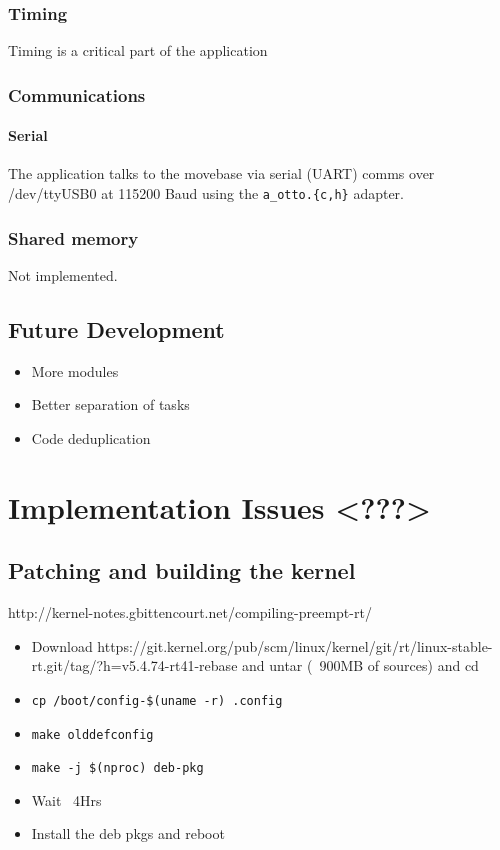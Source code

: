 \documentclass[a4paper,12pt]{report}
\begin{document}
\subsection{Timing}

Timing is a critical part of the application

\subsection{Communications}
\subsubsection{Serial}

The application talks to the movebase via serial (UART) comms over /dev/ttyUSB0 at 115200 Baud using the \texttt{a\_otto.\{c,h\}} adapter.

\subsection{Shared memory}

Not implemented.

\section{Future Development}

\begin{itemize}
    \item More modules
    \item Better separation of tasks
    \item Code deduplication
\end{itemize}

\newpage
\chapter{Implementation Issues <???>}
\section{Patching and building the kernel}

http://kernel-notes.gbittencourt.net/compiling-preempt-rt/

\begin{itemize}
    \item Download https://git.kernel.org/pub/scm/linux/kernel/git/rt/linux-stable-rt.git/tag/?h=v5.4.74-rt41-rebase and untar (~900MB of sources) and cd
    \item \texttt{cp /boot/config-\$(uname -r) .config}
    \item \texttt{make olddefconfig}
    \item \texttt{make -j \$(nproc) deb-pkg}
    \item Wait ~4Hrs
    \item Install the deb pkgs and reboot
\end{itemize}
\end{document}
